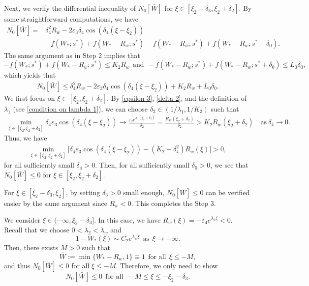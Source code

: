 \documentclass[11pt,a4paper]{article}
\numberwithin{equation}{section}
\numberwithin{figure}{section}
\newcommand\beaa{\begin{eqnarray*}}
\newcommand\eeaa{\end{eqnarray*}}
\begin{document}
Next, we verify the differential inequality of $N_0[\bar W]$ for $\xi\in[\xi_2-\delta_3,\xi_2+\delta_2]$. By some  straightforward computations, we have
\begin{equation*}
\begin{aligned}
N_0[\bar W]=&\delta^2_4R_w-2\varepsilon_3\delta_4\cos(\delta_4(\xi-\xi_2))\\
&-f(W_*;s^*)+f(W_*-R_w;s^*)-f(W_*-R_w;s^*)+f(W_*-R_w;s^*+\delta_0).
\end{aligned}
\end{equation*}
The same argument as in Step 2 implies that
$$-f(W_*;s^*)+f(W_*-R_w;s^*)\le K_2R_w\ \ \text{and}\ \ -f(W_*-R_w;s^*)+f(W_*-R_w;s^*+\delta_0)\le L_0\delta_0,$$
which yields that
\beaa
N_0[\bar W]\leq\delta^2_4R_w-2\varepsilon_3\delta_4\cos(\delta_4(\xi-\xi_2))+K_2R_w+L_0\delta_0.
\eeaa
We first focus on $\xi\in[\xi_2,\xi_2+\delta_2]$. By \eqref{epsilon 3}, \eqref{delta 2}, and the definition of $\lambda_1$ (see \eqref{condition on lambda 1}), we can choose
$\delta_2\in(1/\lambda_1,1/K_2)$ such that
\beaa
\min_{\xi\in[\xi_2,\xi_2+\delta_2]}\delta_4\varepsilon_3\cos(\delta_4(\xi-\xi_2))\to\frac{\varepsilon_2e^{\lambda_1(\xi_2+\delta_2)}}{\delta_2}
=\frac{R_w(\xi_2+\delta_2)}{\delta_2}> K_2R_w(\xi_2+\delta_2)
\quad\text{as}\ \delta_4\to0.
\eeaa
Thus, we have
\beaa%
\min_{\xi\in[\xi_2,\xi_2+\delta_2]}\Big[\delta_4\varepsilon_3\cos(\delta_4(\xi-\xi_2))-(K_2+\delta_4^2)R_w(\xi)\Big]>0,
\eeaa
for all sufficiently small $\delta_4>0$.
Then, for all sufficiently small $\delta_0>0$, %
we see that $N_0[\bar W]\le 0$ for $\xi\in[\xi_2,\xi_2+\delta_2]$.

For $\xi\in[\xi_2-\delta_3,\xi_2]$,
by setting $\delta_3>0$ small enough,
$N_0[\bar W]\le 0$ can be verified easier by the same argument since $R_w<0$. This completes the Step 3.

\medskip

 We consider $\xi\in(-\infty,\xi_2-\delta_3]$. In this case, we have $R_w(\xi)=-\varepsilon_4e^{\lambda_2\xi}<0$.
Recall that we choose $0<\lambda_2<\lambda_w$
and 
$$1-W_*(\xi)\sim C_2 e^{\lambda_{w}\xi}\ \ \text{as}\ \ \xi\to-\infty.$$
Then, there exists $M>0$ such that 
$$\bar W:=\min\{W_*-R_w,1\}\equiv 1\ \ \text{for all} \ \ \xi\le -M,$$
and thus $N_0[\bar W]\le 0$ for all $\xi\le -M$. Therefore, we only need to show 
$$N_0[\bar W]\le 0\ \ \text{for all}\ \ -M\le\xi\le -\xi_2-\delta_3.$$
\end{document}
